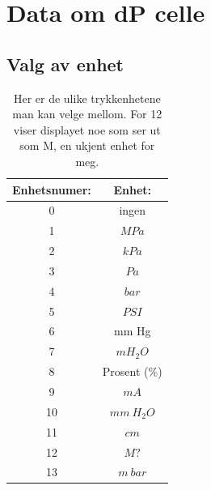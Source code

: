 \documentclass{minmal}
\begin{document}
\section{Data om dP celle}
\subsection{Valg av enhet}
\begin{table}[h]
    \centering
    \begin{tabular}{|c|c|}\hline
         Enhetsnumer:& Enhet:\\\hline
         0& ingen\\\hline
         1& $MPa$\\\hline
         2& $kPa$\\\hline
         3& $Pa$\\\hline
         4& $bar$\\\hline
         5& $PSI$\\\hline
         6& mm Hg\\\hline
         7& $m H_2O$\\\hline
 8&Prosent (\%)\\\hline
         9& $mA$\\\hline
 10&$mm\ H_2O$\\\hline
 11&$cm$\\ \hline
 12&$M?$\\\hline
 13&$m\ bar$\\ \hline
    \end{tabular}
    \caption{Her er de ulike trykkenhetene man kan velge mellom.  For 12 viser displayet noe som ser ut som M, en ukjent enhet for meg.}
    \label{tab:placeholder}
\end{table}
\end{document}
